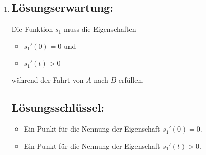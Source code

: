 \begin{langesbeispiel}
{\begin{enumerate}
Die Läuferin würde den Geländepunkt $B$ ca. 5,9\,s nach dem Zeitpunkt $t_2$ erreichen.

	\subsection{Lösungsschlüssel:}
	
\begin{itemize}
	\item Ein Punkt für die richtige Lösung, wobei die Einheit "`m/s"' nicht angegeben sein muss. 
	
	Die Aufgabe ist auch dann als richtig gelöst zu werten, wenn bei korrektem Ansatz das Ergebnis aufgrund eines Rechenfehlers nicht richtig ist.
	\item Ein Punkt für die richtige Lösung, wobei die Einheit "`s"' nicht angegeben sein muss.  
	
	Toleranzintervall: $[5,8\,\text{s}; 5,9\,\text{s}]$
\end{itemize}

\item \subsection{Lösungserwartung:}
			
Die Funktion $s_1$ muss die Eigenschaften
\begin{itemize}
	\item $s_1'(0)=0$ und
	\item $s_1'(t)>0$
\end{itemize}
während der Fahrt von $A$ nach $B$ erfüllen.

	\subsection{Lösungsschlüssel:}
	
\begin{itemize}
	\item Ein Punkt für die Nennung der Eigenschaft $s_1'(0)=0$.
	\item Ein Punkt für die Nennung der Eigenschaft $s_1'(t)>0$.
\end{itemize}
\end{enumerate}}
		\end{langesbeispiel}